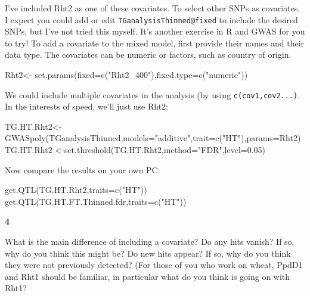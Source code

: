 \documentclass[
]{book}
\makeatletter
\newenvironment{Shaded}{\begin{snugshade}}{\end{snugshade}}
\newcommand{\AttributeTok}[1]{\textcolor[rgb]{0.77,0.63,0.00}{#1}}
\newcommand{\FloatTok}[1]{\textcolor[rgb]{0.00,0.00,0.81}{#1}}
\newcommand{\FunctionTok}[1]{\textcolor[rgb]{0.00,0.00,0.00}{#1}}
\newcommand{\NormalTok}[1]{#1}
\newcommand{\OtherTok}[1]{\textcolor[rgb]{0.56,0.35,0.01}{#1}}
\newcommand{\StringTok}[1]{\textcolor[rgb]{0.31,0.60,0.02}{#1}}
\newenvironment{kframe}{%
\medskip{}
\setlength{\fboxsep}{.8em}
 \def\at@end@of@kframe{}%
 \ifinner\ifhmode%
  \def\at@end@of@kframe{\end{minipage}}%
  \begin{minipage}{\columnwidth}%
 \fi\fi%
 \def\FrameCommand##1{\hskip\@totalleftmargin \hskip-\fboxsep
 \colorbox{shadecolor}{##1}\hskip-\fboxsep
     \hskip-\linewidth \hskip-\@totalleftmargin \hskip\columnwidth}%
 \MakeFramed {\advance\hsize-\width
   \@totalleftmargin\z@ \linewidth\hsize
   \@setminipage}}%
 {\par\unskip\endMakeFramed%
 \at@end@of@kframe}
\newenvironment{rmdblock}[1]
  {
  \begin{itemize}
  \renewcommand{\labelitemi}{
    \raisebox{-.7\height}[0pt][0pt]{
      {\setkeys{Gin}{width=3em,keepaspectratio}\texttt{[image: images/\#1]}}
    }
  }
  \setlength{\fboxsep}{1em}
  \begin{kframe}
  \item
  }
  {
  \end{kframe}
  \end{itemize}
  }
\newenvironment{rmdquiz}
  {\begin{rmdblock}{quiz}}
  {\end{rmdblock}}
\makeatother
\begin{document}
I've included Rht2 as one of these covariates. To select other SNPs as covariates, I expect you could add or edit \texttt{TGanalysisThinned@fixed} to include the desired SNPs, but I've not tried this myself. It's another exercise in R and GWAS for you to try! To add a covariate to the mixed model, first provide their names and their data type. The covariates can be numeric or factors, such as country of origin.

\begin{Shaded}
\begin{Highlighting}[]
\NormalTok{Rht2}\OtherTok{\textless{}{-}} \FunctionTok{set.params}\NormalTok{(}\AttributeTok{fixed=}\FunctionTok{c}\NormalTok{(}\StringTok{"Rht2\_400"}\NormalTok{),}\AttributeTok{fixed.type=}\FunctionTok{c}\NormalTok{(}\StringTok{"numeric"}\NormalTok{))}
\end{Highlighting}
\end{Shaded}

We could include multiple covariates in the analysis (by using \texttt{c(cov1,cov2...)}. In the interests of speed, we'll just use Rht2:

\begin{Shaded}
\begin{Highlighting}[]
\NormalTok{TG.HT.Rht2}\OtherTok{\textless{}{-}}\FunctionTok{GWASpoly}\NormalTok{(TGanalysisThinned,}\AttributeTok{models=}\StringTok{"additive"}\NormalTok{,}\AttributeTok{trait=}\FunctionTok{c}\NormalTok{(}\StringTok{"HT"}\NormalTok{),}\AttributeTok{params=}\NormalTok{Rht2)}
\NormalTok{TG.HT.Rht2 }\OtherTok{\textless{}{-}}\FunctionTok{set.threshold}\NormalTok{(TG.HT.Rht2,}\AttributeTok{method=}\StringTok{"FDR"}\NormalTok{,}\AttributeTok{level=}\FloatTok{0.05}\NormalTok{)}
\end{Highlighting}
\end{Shaded}

Now compare the results on your own PC:

\begin{Shaded}
\begin{Highlighting}[]
\FunctionTok{get.QTL}\NormalTok{(TG.HT.Rht2,}\AttributeTok{traits=}\FunctionTok{c}\NormalTok{(}\StringTok{"HT"}\NormalTok{))}
\FunctionTok{get.QTL}\NormalTok{(TG.HT.FT.Thinned.fdr,}\AttributeTok{traits=}\FunctionTok{c}\NormalTok{(}\StringTok{"HT"}\NormalTok{)) }
\end{Highlighting}
\end{Shaded}

\begin{rmdquiz}
\textbf{4}

What is the main difference of including a covariate? Do any hits vanish? If so, why do you think this might be? Do new hits appear? If so, why do you think they were not previously detected? (For those of you who work on wheat, PpdD1 and Rht1 should be familiar, in particular what do you think is going on with Rht1?
\end{rmdquiz}
\end{document}
